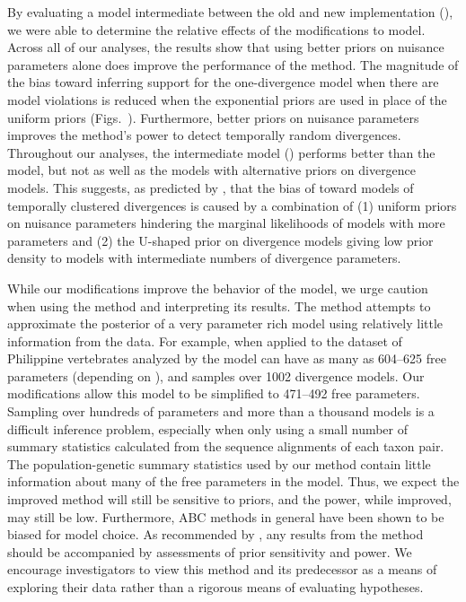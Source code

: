 By evaluating a model intermediate between the old and new implementation
(\modelUshaped), we were able to determine the relative effects of the
modifications to model.
Across all of our analyses, the results show that using better priors on
nuisance parameters alone does improve the performance of the method.
The magnitude of the bias toward inferring support for the one-divergence
model when there are model violations is reduced when the exponential
priors are used in place of the uniform priors (Figs.\
).
Furthermore, better priors on nuisance parameters improves the method's
power to detect temporally random divergences.
Throughout our analyses, the intermediate model (\modelUshaped) performs
better than the \msb model, but not as well as the models with alternative
priors on divergence models.
This suggests, as predicted by \citet{Oaks2012}, that the bias of \msb toward
models of temporally clustered divergences is caused by a combination of
(1) uniform priors on nuisance parameters hindering the marginal likelihoods of
models with more \divTime{} parameters and
(2) the U-shaped prior on divergence models giving low prior density to models
with intermediate numbers of divergence parameters.

While our modifications improve the behavior of the model, we urge
caution when using the method and interpreting its results.
The method attempts to approximate the posterior of a very parameter rich model
using relatively little information from the data.
For example, when applied to the dataset of Philippine vertebrates analyzed by
\citet{Oaks2012} the model can have as many as 604--625 free parameters
(depending on \divTimeNum), and samples over 1002 divergence models.
Our modifications allow this model to be simplified to 471--492 free
parameters.
Sampling over hundreds of parameters and more than a thousand models is a
difficult inference problem, especially when only using a small number of
summary statistics calculated from the sequence alignments of each taxon pair.
The population-genetic summary statistics used by our method contain little
information about many of the free parameters in the model.
Thus, we expect the improved method will still be sensitive to priors, and the
power, while improved, may still be low.
Furthermore, ABC methods in general have been shown to be biased
\citep{Robert2011} for model choice.
As recommended by \citet{Oaks2012}, any results from the method should be
accompanied by assessments of prior sensitivity and power.
We encourage investigators to view this method and its predecessor as a means
of exploring their data rather than a rigorous means of evaluating hypotheses.

